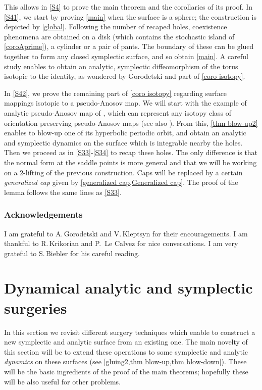 \documentclass[JEP,XML,SOM,Unicode,NoFloatCountersInSection,Unicode,published]{cedram}
\theoremstyle{definition}
\begin{document}
This allows in \cref{S4} to prove the main theorem and the corollaries of its proof. In \cref{S41}, we start by proving \cref{main} when the surface is a sphere; the construction is depicted by \cref{global}. Following the number of recaped holes, coexistence phenomena are obtained on a disk (which contains the stochastic island of \cref{coroAprime}), a cylinder or a pair of pants. The boundary of these can be glued together to form any closed symplectic surface, and so obtain \cref{main}. A careful study enables to obtain an analytic, symplectic diffeomorphism of the torus isotopic to the identity, as wondered by Gorodetski and part of \cref{coro isotopy}.

In \cref{S42}, we prove the remaining part of \cref{coro isotopy} regarding surface mappings isotopic to a pseudo-Anosov map. We will start with the example of analytic pseudo-Anosov map of \cite{Ge85}, which can represent any isotopy class of orientation preserving pseudo-Anosov maps (see also \cite{GK82}). From this, \cref{thm blow-up2} enables to blow-up one of its hyperbolic periodic orbit, and obtain an analytic and symplectic dynamics on the surface which is integrable nearby the holes. Then we proceed as in \cref{S33}-\ref{S34} to recap these holes. The only difference is that the normal form \cite{Mo56} at the saddle points is more general and that we will be working on a $2$-lifting of the previous construction. Caps will be replaced by a certain \emph{generalized cap} given by \cref{generalized cap,Generalized cap}. The proof of the lemma follows the same lines as \cref{S33}.\enlargethispage{.5\baselineskip}%

\subsubsection*{Acknowledgements}
I am grateful to A.\,Gorodetski and V.\,Kleptsyn for their encouragements. I am thankful to R.\,Krikorian and P.~Le Calvez for nice conversations. I am very grateful to S.\,Biebler for his careful reading.

\section{Dynamical analytic and symplectic surgeries}\label{S2}

In this section we revisit different surgery techniques which enable to construct a new symplectic and analytic surface from an existing one. The main novelty of this section will be to extend these operations to some symplectic and analytic \emph{dynamics} on these surfaces (see \cref{gluing2,thm blow-up,thm blow-down}). These will be the basic ingredients of the proof of the main theorems; hopefully these will be also useful for other problems.
\end{document}

